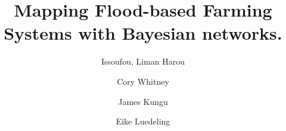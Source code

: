 \documentclass[]{elsarticle} %
\begin{document}
\begin{frontmatter}

  \title{Mapping Flood-based Farming Systems with Bayesian networks.}
    \author[KU,ICRAF]{Issoufou, Liman Harou}
    \author[INRES]{Cory Whitney}
    \author[KU]{James Kungu}
    \author[INRES]{Eike Luedeling}
      \address[KU]{Kenyatta University, Department of Environmental Sciences, P.O. Box 43844 00100 Nairobi, Kenya}
    \address[ICRAF]{World Agroforestry Centre (ICRAF), United Nations Avenue, Gigiri, P.O. Box 30677-00100, Nairobi, Kenya}
    \address[INRES]{University of Bonn, Department of Horticultural Sciences, Auf dem Hügel 6, D-53121, Bonn, Germany}
    \address[ZEF]{Center for Development research (ZEF), University of Bonn, Genscherallee 3, D-53113, Bonn, Germany}
    

\end{frontmatter}
\end{document}
